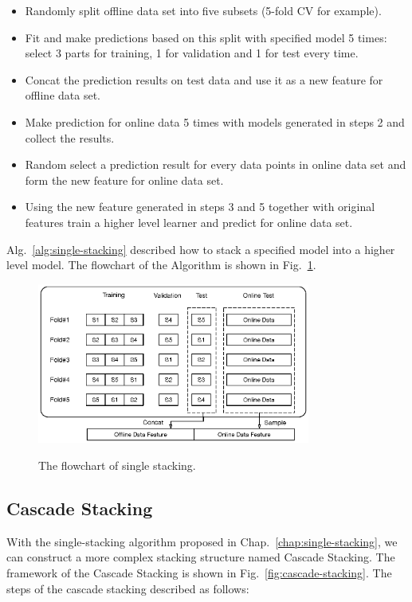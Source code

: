 \documentclass[12pt]{article}
\begin{document}
\begin{itemize}
\label{alg:single-stacking}
\item[1.] Randomly split offline data set into five subsets (5-fold CV for example).
\item[2.] Fit and make predictions based on this split with specified model 5 times: select 3 parts for training, 1 for validation and 1 for test every time.
\item[3.] Concat the prediction results on test data and use it as a new feature for offline data set.
\item[4.] Make prediction for online data 5 times with models generated in steps 2 and collect the results.
\item[5.] Random select a prediction result for every data points in online data set and form the new feature for online data set.
\item[6.] Using the new feature generated in steps 3 and 5 together with original features train a higher level learner and predict for online data set.
\end{itemize}

Alg.~{\ref{alg:single-stacking}} described how to stack a specified model into a higher level model. The flowchart of the Algorithm is shown in Fig.~{\ref{fig:single-stacking}}.


\begin{figure}[ht]
  \centering
  \includegraphics[width=0.8\textwidth]{../img/single-stacking}\\
  \caption{The flowchart of single stacking.}
  \label{fig:single-stacking}
\end{figure}

\subsection{Cascade Stacking}

With the single-stacking algorithm proposed in Chap.~{\ref{chap:single-stacking}}, we can construct a more complex stacking structure named Cascade Stacking. The framework of the Cascade Stacking is shown in Fig.~{\ref{fig:cascade-stacking}}. The steps of the cascade stacking described as follows:
\end{document}
